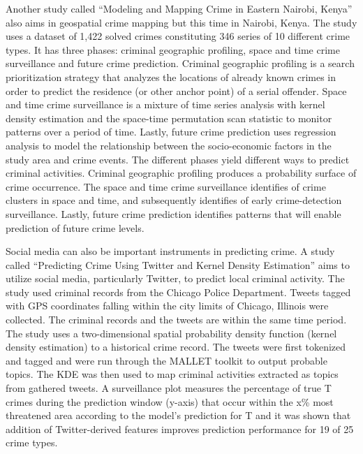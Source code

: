     Another study called “Modeling and Mapping Crime in Eastern Nairobi, Kenya” \cite{mburu2014modeling} also aims in geospatial crime mapping but this time in Nairobi, Kenya. The study uses a dataset of 1,422 solved crimes constituting 346 series of 10 different crime types. It has three phases: criminal geographic profiling, space and time crime surveillance and future crime prediction. Criminal geographic profiling is a search prioritization strategy that analyzes the locations of already known crimes in order to predict the residence (or other anchor point) of a serial offender. Space and time crime surveillance is a mixture of time series analysis with kernel density estimation and the space-time permutation scan statistic to monitor patterns over a period of time. Lastly, future crime prediction uses regression analysis to model the relationship between the socio-economic factors in the study area and crime events. The different phases yield different ways to predict criminal activities. Criminal geographic profiling produces a probability surface of crime occurrence. The space and time crime surveillance identifies of crime clusters in space and time, and subsequently identifies of early crime-detection surveillance. Lastly, future crime prediction identifies patterns that will enable prediction of future crime levels.

    Social media can also be important instruments in predicting crime. A study called “Predicting Crime Using Twitter and Kernel Density Estimation” \cite{gerber2014predicting} aims to utilize social media, particularly Twitter, to predict local criminal activity. The study used criminal records from the Chicago Police Department. Tweets tagged with GPS coordinates falling within the city limits of Chicago, Illinois were collected. The criminal records and the tweets are within the same time period. The study uses a two-dimensional spatial probability density function (kernel density estimation) to a historical crime record. The tweets were first tokenized and tagged and were run through the MALLET toolkit to output probable topics. The KDE was then used to map criminal activities extracted as topics from gathered tweets. A surveillance plot measures the percentage of true T crimes during the prediction window (y-axis) that occur within the x\% most threatened area according to the model's prediction for T and it was shown that addition of Twitter-derived features improves prediction performance for 19 of 25 crime types.


